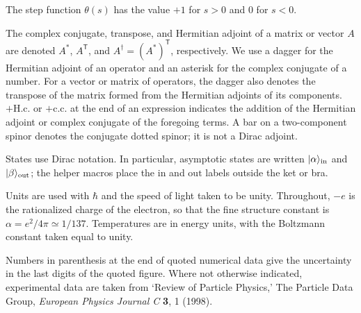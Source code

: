 The step function \(\theta(s)\) has the value \(+1\) for \(s>0\) and \(0\) for
\(s<0\).

The complex conjugate, transpose, and Hermitian adjoint of a matrix or vector
\(A\) are denoted \(A^*\), \(A^{\mathsf T}\), and
\(A^\dagger=(A^*)^{\mathsf T}\), respectively. We use a dagger for the
Hermitian adjoint of an operator and an asterisk for the complex conjugate of a
number. For a vector or matrix of operators, the dagger also denotes the
transpose of the matrix formed from the Hermitian adjoints of its components.
\(+\mathrm{H.c.}\) or \(+\mathrm{c.c.}\) at the end of an expression indicates
the addition of the Hermitian adjoint or complex conjugate of the foregoing
terms. A bar on a two-component spinor denotes the conjugate dotted spinor;
it is not a Dirac adjoint.

States use Dirac notation. In particular, asymptotic states are written
\(\lvert \alpha\rangle_{\mathrm{in}}\) and \(\lvert \beta\rangle_{\mathrm{out}}\); the helper macros place the
\(\mathrm{in}\) and \(\mathrm{out}\) labels outside the ket or bra.

Units are used with \(\hbar\) and the speed of light taken to be unity.
Throughout, \(-e\) is the rationalized charge of the electron, so that the
fine structure constant is \(\alpha=e^2/4\pi\simeq1/137\). Temperatures are in
energy units, with the Boltzmann constant taken equal to unity.

Numbers in parenthesis at the end of quoted numerical data give the
uncertainty in the last digits of the quoted figure. Where not otherwise
indicated, experimental data are taken from `Review of Particle Physics,' The
Particle Data Group, \emph{European Physics Journal C} \textbf{3}, 1 (1998).
